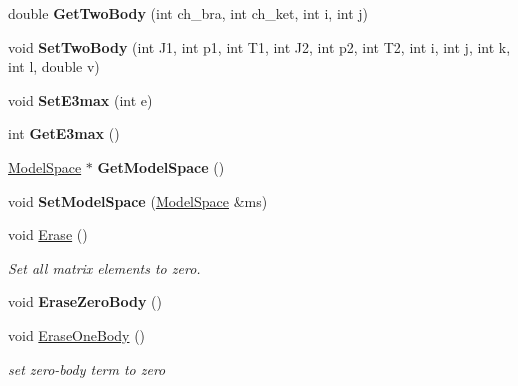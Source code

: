 \begin{DoxyCompactItemize}
\item 
\mbox{\label{classOperator_a5ef7a48c8c873a79ff695a6b71d83803}} 
double {\bfseries Get\+Two\+Body} (int ch\+\_\+bra, int ch\+\_\+ket, int i, int j)
\item 
\mbox{\label{classOperator_a04d1aa8242f17370f5827aad6b3f6ddb}} 
void {\bfseries Set\+Two\+Body} (int J1, int p1, int T1, int J2, int p2, int T2, int i, int j, int k, int l, double v)
\item 
\mbox{\label{classOperator_a8b32ed75e5e0d6175a2f2f517c63a89c}} 
void {\bfseries Set\+E3max} (int e)
\item 
\mbox{\label{classOperator_a42d67df774701e40e2c49e539a68c937}} 
int {\bfseries Get\+E3max} ()
\item 
\mbox{\label{classOperator_aeacbeb2efba4199ad20291b50f03f4f6}} 
\hyperlink{classModelSpace}{Model\+Space} $\ast$ {\bfseries Get\+Model\+Space} ()
\item 
\mbox{\label{classOperator_ade09f5e47031f285f10d7f4f8a5e0216}} 
void {\bfseries Set\+Model\+Space} (\hyperlink{classModelSpace}{Model\+Space} \&ms)
\item 
\mbox{\label{classOperator_a8a0f7d6aa5163929850d06b31dc24a55}} 
void \hyperlink{classOperator_a8a0f7d6aa5163929850d06b31dc24a55}{Erase} ()
\begin{DoxyCompactList}\small\item\em Set all matrix elements to zero. \end{DoxyCompactList}\item 
\mbox{\label{classOperator_aee08b8c721271c700f325e02ba7b47d1}} 
void {\bfseries Erase\+Zero\+Body} ()
\item 
void \hyperlink{classOperator_ab26470d0c88d61699443223675e57bbe}{Erase\+One\+Body} ()
\begin{DoxyCompactList}\small\item\em set zero-\/body term to zero \end{DoxyCompactList}\item 
\mbox{\label{classOperator_a5c49da3f408b79a7430af4e3ec1ff8df}} 

\end{DoxyCompactItemize}
